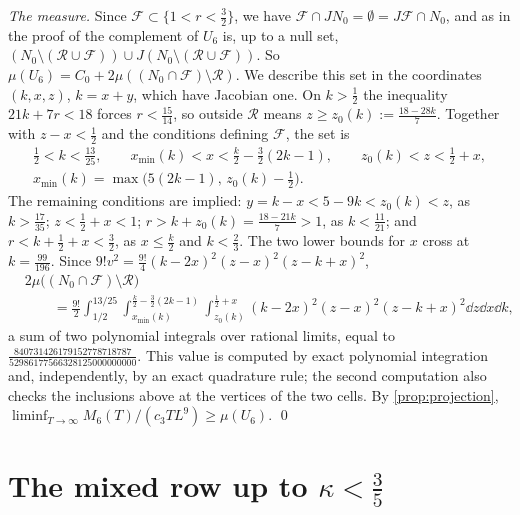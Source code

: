 \documentclass[11pt,colorlinks]{charlie}
\begin{document}
\emph{The measure.} Since $\mathcal F\subset\{1<r<\frac32\}$, we have $\mathcal F\cap JN_0=\emptyset=J\mathcal F\cap N_0$, and as in the proof of  the complement of $U_6$ is, up to a null set, $(N_0\setminus(\mathcal R\cup\mathcal F))\cup J(N_0\setminus(\mathcal R\cup\mathcal F))$. So $\mu(U_6)=C_0+2\mu((N_0\cap\mathcal F)\setminus\mathcal R)$. We describe this set in the coordinates $(k,x,z)$, $k=x+y$, which have Jacobian one. On $k>\frac12$ the inequality $21k+7r<18$ forces $r<\frac{15}{14}$, so outside $\mathcal R$ means $z\ge z_0(k):=\frac{18-28k}7$. Together with $z-x<\frac12$ and the conditions defining $\mathcal F$, the set is
\begin{gather*}
 \tfrac12<k<\tfrac{13}{25},\qquad x_{\min}(k)<x<\tfrac k2-\tfrac32(2k-1),\qquad z_0(k)<z<\tfrac12+x,\\
 x_{\min}(k)=\max\big(5(2k-1),\,z_0(k)-\tfrac12\big).
\end{gather*}
The remaining conditions are implied: $y=k-x<5-9k<z_0(k)<z$, as $k>\frac{17}{35}$; $z<\frac12+x<1$; $r>k+z_0(k)=\frac{18-21k}7>1$, as $k<\frac{11}{21}$; and $r<k+\frac12+x<\frac32$, as $x\le\frac k2$ and $k<\frac23$. The two lower bounds for $x$ cross at $k=\frac{99}{196}$. Since $9!v^2=\frac{9!}4(k-2x)^2(z-x)^2(z-k+x)^2$,
\[
 \begin{split}
 &2\mu\big((N_0\cap\mathcal F)\setminus\mathcal R\big)\\
 &\qquad=\frac{9!}2\int_{1/2}^{13/25}\int_{x_{\min}(k)}^{\frac k2-\frac32(2k-1)}\int_{z_0(k)}^{\frac12+x}(k-2x)^2(z-x)^2(z-k+x)^2\dd z\dd x\dd k ,
 \end{split}
\]
a sum of two polynomial integrals over rational limits, equal to $\frac{840731426179152778718787}{52986177566328125000000000}$. This value is computed by exact polynomial integration and, independently, by an exact quadrature rule; the second computation also checks the inclusions above at the vertices of the two cells. By \cref{prop:projection}, $\liminf_{T\to\infty}M_6(T)/(c_3TL^9)\ge\mu(U_6)$. \qed

\section{The mixed row up to $\kappa<\frac35$}\label{sec:mixedrow}
\end{document}
